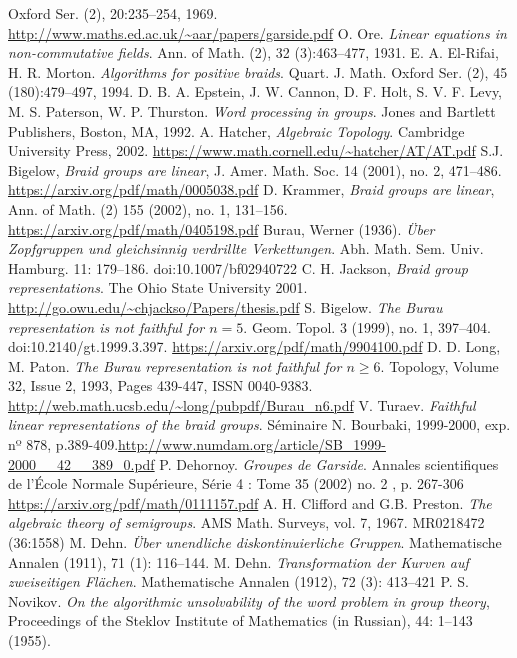 \documentclass[TFG.tex]{subfiles}
\begin{document}
\begin{thebibliography}{}
Oxford Ser. (2), 20:235–254, 1969. \url{http://www.maths.ed.ac.uk/~aar/papers/garside.pdf}
 O. Ore. \emph{Linear equations in non-commutative fields}. Ann. of Math.
(2), 32 (3):463–477, 1931.
E. A. El-Rifai, H. R. Morton. \emph{Algorithms for positive braids}.
Quart. J. Math. Oxford Ser. (2), 45 (180):479–497, 1994.
 D. B. A. Epstein, J. W. Cannon, D. F. Holt, S. V. F. Levy, M. S.
Paterson, W. P. Thurston. \emph{Word processing in groups}. Jones and
Bartlett Publishers, Boston, MA, 1992.
 A. Hatcher, \emph{Algebraic Topology}. Cambridge University Press, 2002. \url{https://www.math.cornell.edu/~hatcher/AT/AT.pdf}
 S.J. Bigelow, \emph{Braid groups are linear}, J. Amer. Math. Soc. 14 (2001), no. 2,
471–486. \url{https://arxiv.org/pdf/math/0005038.pdf}
 D. Krammer, \emph{Braid groups are linear}, Ann. of Math. (2) 155 (2002), no. 1,
131–156. \url{https://arxiv.org/pdf/math/0405198.pdf}
 Burau, Werner (1936). \emph{Über Zopfgruppen und gleichsinnig verdrillte Verkettungen}. Abh. Math. Sem. Univ. Hamburg. 11: 179–186. doi:10.1007/bf02940722
 C. H. Jackson, \emph{Braid group representations}. The Ohio State University
2001. \url{http://go.owu.edu/~chjackso/Papers/thesis.pdf}
 S. Bigelow. \emph{The Burau representation is not faithful for $n = 5$}. Geom. Topol. 3 (1999), no. 1, 397--404. doi:10.2140/gt.1999.3.397. 
\url{https://arxiv.org/pdf/math/9904100.pdf}
D. D. Long, M. Paton.
\emph{The Burau representation is not faithful for $n ≥ 6$}.
Topology,
Volume 32, Issue 2,
1993,
Pages 439-447,
ISSN 0040-9383. \url{http://web.math.ucsb.edu/~long/pubpdf/Burau_n6.pdf}
 V. Turaev. \emph{Faithful linear representations of the braid groups}. Séminaire N. Bourbaki, 1999-2000, exp. nº 878, p.389-409.\url{http://www.numdam.org/article/SB_1999-2000__42__389_0.pdf}
 P. Dehornoy. \emph{Groupes de Garside}. Annales scientifiques de l'École Normale Supérieure, Série 4 : Tome 35 (2002) no. 2 , p. 267-306 \url{https://arxiv.org/pdf/math/0111157.pdf}
  A. H. Clifford and G.B. Preston. \emph{The algebraic theory of semigroups}. AMS Math. Surveys,
vol. 7, 1967. MR0218472 (36:1558)
 M. Dehn. \emph{Über unendliche diskontinuierliche Gruppen}. Mathematische Annalen (1911), 71 (1): 116–144.
 M. Dehn. \emph{Transformation der Kurven auf zweiseitigen Flächen}. Mathematische Annalen (1912), 72 (3): 413–421
  P. S. Novikov. \emph{On the algorithmic unsolvability of the word problem in group theory}, Proceedings of the Steklov Institute of Mathematics (in Russian), 44: 1–143 (1955). 
\end{thebibliography}
\end{document}
